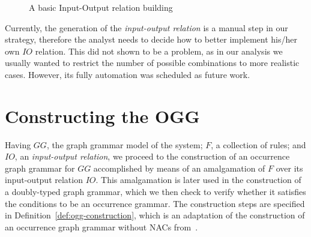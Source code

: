 \begin{example}
\begin{figure}[!ht]
  \caption{A basic Input-Output relation building}\label{fig:tests:inout}
\end{figure}
\end{example}

Currently, the generation of the \textit{input-output relation} is a manual step in our strategy, therefore the analyst needs to decide how to better implement his/her own $IO$ relation. This did not shown to be a problem, as in our analysis we usually wanted to restrict the number of possible combinations to more realistic cases. However, its fully automation was scheduled as future work.


\section{Constructing the OGG}

  Having $GG$, the graph grammar model of the system; $F$, a collection of rules; and $IO$, an \emph{input-output relation}, we proceed to the construction of an occurrence graph grammar for $GG$ accomplished by means of an amalgamation of $F$ over its input-output relation $IO$.
  This amalgamation is later used in the construction of a doubly-typed graph grammar, which we then check to verify whether it satisfies the conditions to be an occurrence grammar. The construction steps are specified in
  Definition~\ref{def:ogg-construction}, which is an adaptation of the construction of an occurrence graph grammar without NACs from~\cite{Corradini1996}.

